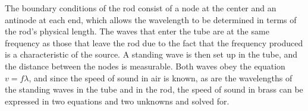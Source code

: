\documentclass[twocolumn,english]{IEEEtran}
\theoremstyle{plain}
\theoremstyle{plain}
\begin{document}
\begin{enumerate}
 The boundary conditions of the rod consist of a node at the center and an antinode at each end, which allows the wavelength to be determined in terms of the rod's physical length. The waves that enter the tube are at the same frequency as those that leave the rod due to the fact that the frequency produced is a characteristic of the source. A standing wave is then set up in the tube, and the distance between the nodes is measurable. Both waves obey the equation $v=f\lambda$, and since the speed of sound in air is known, as are the wavelengths of the standing waves in the tube and in the rod, the speed of sound in brass can be expressed in two equations and two unknowns and solved for. \\
\end{enumerate}

\appendices{}



\end{document}
